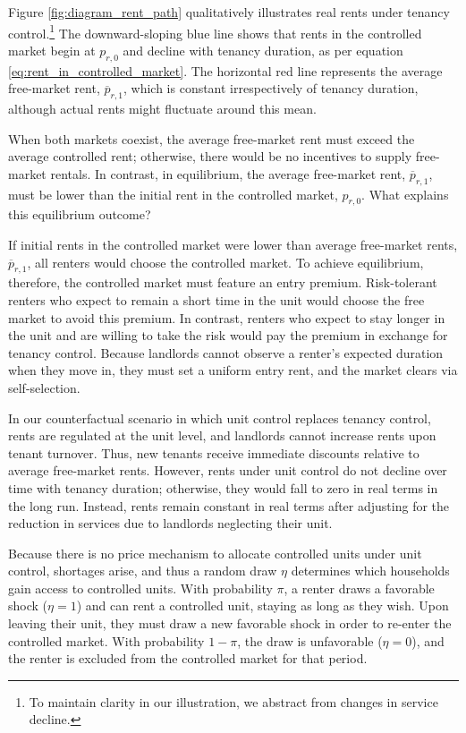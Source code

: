 \documentclass[parskip=full]{article}
\begin{document}
Figure \ref{fig:diagram_rent_path} qualitatively illustrates real rents under tenancy control.\footnote{To maintain clarity in our illustration, we abstract from changes in service decline.} The downward-sloping blue line shows that rents in the controlled market begin at $p_{r,0}$ and decline with tenancy duration, as per equation \eqref{eq:rent_in_controlled_market}. The horizontal red line represents the average free-market rent, $\overline{p}_{r,1}$, which is constant irrespectively of tenancy duration, although actual rents might fluctuate around this mean. 

When both markets coexist, the average free-market rent must exceed the average controlled rent; otherwise, there would be no incentives to supply free-market rentals. In contrast, in equilibrium, the average free-market rent, $\overline{p}_{r,1}$, must be lower than the initial rent in the controlled market, $p_{r,0}$. What explains this equilibrium outcome?

If initial rents in the controlled market were lower than average free-market rents, $\overline{p}_{r,1}$, all renters would choose the controlled market. To achieve equilibrium, therefore, the controlled market must feature an entry premium. Risk-tolerant renters who expect to remain a short time in the unit would choose the free market to avoid this premium. In contrast, renters who expect to stay longer in the unit and are willing to take the risk would pay the premium in exchange for tenancy control. Because landlords cannot observe a renter's expected duration when they move in, they must set a uniform entry rent, and the market clears via self-selection.

In our counterfactual scenario in which unit control replaces tenancy control, rents are regulated at the unit level, and landlords cannot increase rents upon tenant turnover. Thus, new tenants receive immediate discounts relative to average free-market rents. However, rents under unit control do not decline over time with tenancy duration; otherwise, they would fall to zero in real terms in the long run. Instead, rents remain constant in real terms after adjusting for the reduction in services due to landlords neglecting their unit. 

Because there is no price mechanism to allocate controlled units under unit control, shortages arise, and thus a random draw $\eta$ determines which households gain access to controlled units. With probability $\pi$, a renter draws a favorable shock ($\eta=1$) and can rent a controlled unit, staying as long as they wish. Upon leaving their unit, they must draw a new favorable shock in order to re-enter the controlled market. With probability $1-\pi$, the draw is unfavorable ($\eta=0$), and the renter is excluded from the controlled market for that period. 
\end{document}
